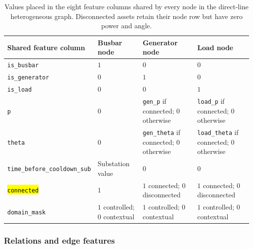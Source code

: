 \begin{table}[H]
  \centering
  \scriptsize
  \caption{Values placed in the eight feature columns shared by every node in
  the direct-line heterogeneous graph. Disconnected assets retain their node
  row but have zero power and angle.}
  \label{tab:heterogeneous-node-features}
  \setlength{\tabcolsep}{4pt}
  \begin{tabular}{L{0.34\textwidth}L{0.18\textwidth}L{0.20\textwidth}L{0.20\textwidth}}
    \toprule
    Shared feature column & Busbar node & Generator node & Load node \\
    \midrule
    \texttt{is\_busbar} & $1$ & $0$ & $0$ \\
    \texttt{is\_generator} & $0$ & $1$ & $0$ \\
    \texttt{is\_load} & $0$ & $0$ & $1$ \\
    \texttt{p} & $0$ & \texttt{gen\_p} if connected; $0$ otherwise & \texttt{load\_p} if connected; $0$ otherwise \\
    \texttt{theta} & $0$ & \texttt{gen\_theta} if connected; $0$ otherwise & \texttt{load\_theta} if connected; $0$ otherwise \\
    \texttt{time\_before\_cooldown\_sub} & Substation value & $0$ & $0$ \\
    \hl{\texttt{connected}} & $1$ & $1$ connected; $0$ disconnected & $1$ connected; $0$ disconnected \\
    \texttt{domain\_mask} & $1$ controlled; $0$ contextual & $1$ controlled; $0$ contextual & $1$ controlled; $0$ contextual \\
    \bottomrule
  \end{tabular}
\end{table}

\subsubsection{Relations and edge features}
\label{subsec:heterogeneous-relations}

